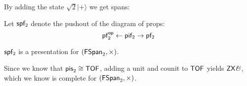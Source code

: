 By adding the state $\sqrt{2} |+\rangle$ we get spans:
\begin{definition}
Let ${\sf sp}\mathsf{f}_2$ denote the pushout of the diagram of props:
$$
\mathsf{p}\mathsf{f}_2^{\mathsf{op}}\leftarrow \mathsf{p}\mathsf{i}\mathsf{f}_2 \rightarrow \mathsf{p}\mathsf{f}_2
$$
\end{definition}
\begin{lemma}
\label{lem:spanand}
${\sf sp}\mathsf{f}_2$ is a presentation for  $(\mathsf{FSpan}_2,\times)$.
\end{lemma}
Since we know that ${\sf pis}_2\cong \mathsf{TOF}$, adding a unit and counit to $\mathsf{TOF}$ yields $\mathsf{ZX}\textit{\&}$, which we know is complete for $(\mathsf{FSpan}_2,\times)$.
%
%
%
%
%
%
%
%
%
%


%
%






